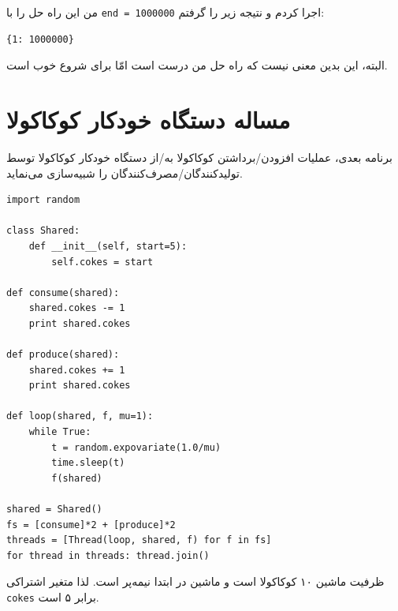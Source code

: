 \documentclass{book}
\newcommand{\clearemptydoublepage}{\newpage\cleardoublepage}
\begin{document}
    من این راه حل را با  {\tt end = 1000000} اجرا کردم و نتیجه زیر را گرفتم: 
\begin{latin}
\begin{verbatim}
{1: 1000000}
\end{verbatim}
\end{latin}

    البته، این بدین معنی نیست که راه حل من درست است امّا برای شروع خوب است. 
    


\clearemptydoublepage
\section {مساله دستگاه خودکار کوکاکولا}

    برنامه بعدی، عملیات افزودن/برداشتن  کوکاکولا به/از دستگاه خودکار کوکاکولا توسط تولیدکنندگان/مصرف‌کنندگان را شبیه‌سازی می‌نماید. 

\begin{latin}
\begin{lstlisting}
import random

class Shared:
    def __init__(self, start=5):
        self.cokes = start

def consume(shared):
    shared.cokes -= 1
    print shared.cokes

def produce(shared):
    shared.cokes += 1
    print shared.cokes

def loop(shared, f, mu=1):
    while True:
        t = random.expovariate(1.0/mu)
        time.sleep(t)
        f(shared)

shared = Shared()
fs = [consume]*2 + [produce]*2 
threads = [Thread(loop, shared, f) for f in fs]
for thread in threads: thread.join()
\end{lstlisting}
\end{latin}

    ظرفیت ماشین ۱۰ کوکاکولا است و ماشین در ابتدا نیمه‌پر است. لذا متغیر اشتراکی {\tt cokes} برابر ۵ است. 
\end{document}
